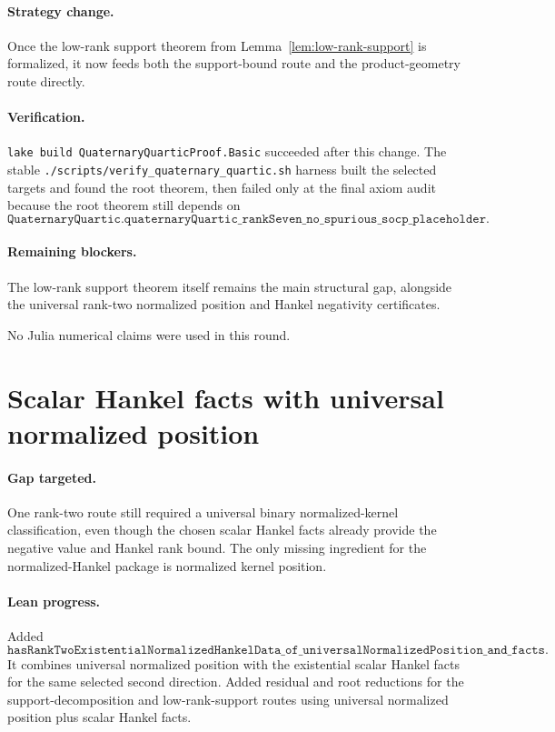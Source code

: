 \documentclass[11pt]{article}
\begin{document}
\paragraph{Strategy change.}
Once the low-rank support theorem from Lemma~\ref{lem:low-rank-support} is
formalized, it now feeds both the support-bound route and the product-geometry
route directly.

\paragraph{Verification.}
\texttt{lake build QuaternaryQuarticProof.Basic} succeeded after this change.
The stable \texttt{./scripts/verify\_quaternary\_quartic.sh} harness built the
selected targets and found the root theorem, then failed only at the final axiom
audit because the root theorem still depends on
\[
\texttt{QuaternaryQuartic.quaternaryQuartic\_rankSeven\_no\_spurious\_socp\_placeholder}.
\]

\paragraph{Remaining blockers.}
The low-rank support theorem itself remains the main structural gap, alongside
the universal rank-two normalized position and Hankel negativity certificates.

No Julia numerical claims were used in this round.

\section*{Scalar Hankel facts with universal normalized position}

\paragraph{Gap targeted.}
One rank-two route still required a universal binary normalized-kernel
classification, even though the chosen scalar Hankel facts already provide the
negative value and Hankel rank bound.  The only missing ingredient for the
normalized-Hankel package is normalized kernel position.

\paragraph{Lean progress.}
Added
\[
\texttt{hasRankTwoExistentialNormalizedHankelData\_of\_universalNormalizedPosition\_and\_facts}.
\]
It combines universal normalized position with the existential scalar Hankel
facts for the same selected second direction.  Added residual and root
reductions for the support-decomposition and low-rank-support routes using
universal normalized position plus scalar Hankel facts.
\end{document}
